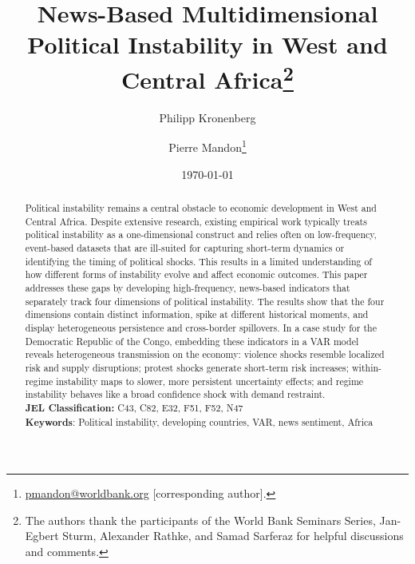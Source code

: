 \documentclass[12pt,a4paper,fleqn]{article}
\title{News-Based Multidimensional Political Instability in West and Central Africa\thanks{The authors thank the participants of the World Bank Seminars Series, Jan-Egbert Sturm, Alexander Rathke, and Samad Sarferaz for helpful discussions and comments.}}
\author[$\ddagger$]{Philipp Kronenberg}
\author[$\dagger$ $\lozenge$]{Pierre Mandon\thanks{\protect\url{pmandon@worldbank.org} [corresponding author].}}
\affil[$\ddagger$]{\small KOF Swiss Economic Institute, ETH Zurich, Switzerland}
\affil[$\dagger$]{\small World Bank Group, Washington, D.C., USA}
\affil[$\lozenge$]{\small CERDI \& University of Clermont Auvergne, Clermont-Ferrand, France}
\date{\today}
\begin{document}
\makeatletter
\let\origsection\section
\renewcommand\section{\FloatBarrier\origsection}
\let\origsubsection\subsection
\renewcommand\subsection{\FloatBarrier\origsubsection}
\makeatother

\maketitle

\begin{abstract}

\thispagestyle{empty}


\noindent Political instability remains a central obstacle to economic development in West and Central Africa. Despite extensive research, existing empirical work typically treats political instability as a one-dimensional construct and relies often on low-frequency, event-based datasets that are ill-suited for capturing short-term dynamics or identifying the timing of political shocks. This results in a limited understanding of how different forms of instability evolve and affect economic outcomes. This paper addresses these gaps by developing high-frequency, news-based indicators that separately track four dimensions of political instability. The results show that the four dimensions contain distinct information, spike at different historical moments, and display heterogeneous persistence and cross-border spillovers. In a case study for the Democratic Republic of the Congo, embedding these indicators in a VAR model %
reveals heterogeneous transmission on the economy: violence shocks resemble localized risk and supply disruptions; protest shocks generate short-term risk increases; within-regime instability maps to slower, more persistent uncertainty effects; and regime instability behaves like a broad confidence shock with demand restraint.\\

\noindent \textbf{JEL Classification:} C43, C82, E32, F51, F52, N47 \\
\noindent \textbf{Keywords}: Political instability, developing countries, VAR, news sentiment, Africa


\end{abstract}
\clearpage
\end{document}

